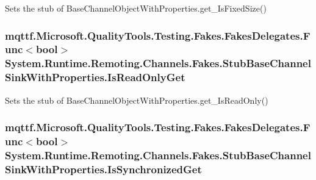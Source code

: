 Sets the stub of Base\-Channel\-Object\-With\-Properties.\-get\-\_\-\-Is\-Fixed\-Size()

\hypertarget{class_system_1_1_runtime_1_1_remoting_1_1_channels_1_1_fakes_1_1_stub_base_channel_sink_with_properties_afa53d176527ffa9365944d44d4d2a34e}{
\subsubsection[{Is\-Read\-Only\-Get}]{\setlength{\rightskip}{0pt plus 5cm}mqttf.\-Microsoft.\-Quality\-Tools.\-Testing.\-Fakes.\-Fakes\-Delegates.\-Func$<$bool$>$ System.\-Runtime.\-Remoting.\-Channels.\-Fakes.\-Stub\-Base\-Channel\-Sink\-With\-Properties.\-Is\-Read\-Only\-Get}}\label{class_system_1_1_runtime_1_1_remoting_1_1_channels_1_1_fakes_1_1_stub_base_channel_sink_with_properties_afa53d176527ffa9365944d44d4d2a34e}


Sets the stub of Base\-Channel\-Object\-With\-Properties.\-get\-\_\-\-Is\-Read\-Only()

\hypertarget{class_system_1_1_runtime_1_1_remoting_1_1_channels_1_1_fakes_1_1_stub_base_channel_sink_with_properties_a356e38928e21847505f1327d9bfee7d1}{
\subsubsection[{Is\-Synchronized\-Get}]{\setlength{\rightskip}{0pt plus 5cm}mqttf.\-Microsoft.\-Quality\-Tools.\-Testing.\-Fakes.\-Fakes\-Delegates.\-Func$<$bool$>$ System.\-Runtime.\-Remoting.\-Channels.\-Fakes.\-Stub\-Base\-Channel\-Sink\-With\-Properties.\-Is\-Synchronized\-Get}}\label{class_system_1_1_runtime_1_1_remoting_1_1_channels_1_1_fakes_1_1_stub_base_channel_sink_with_properties_a356e38928e21847505f1327d9bfee7d1}


